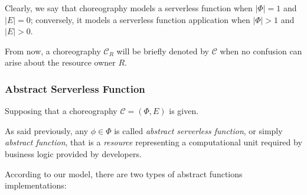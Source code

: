 \documentclass[12pt,a4paper]{report}
\begin{document}
Clearly, we say that choreography models a serverless function when $|\Phi| = 1$ and $|E| = 0$; conversely, it models a serverless function application when $|\Phi| > 1$ and $|E| > 0$.

From now, a choreography $\mathcal{C}_R$ will be briefly denoted by $\mathcal{C}$ when no confusion can arise about the resource owner $R$.

\subsubsection{Abstract Serverless Function}

Supposing that a choreography $\mathcal{C} = (\Phi,E)$ is given.

As said previously, any $\phi \in \Phi$ is called \textit{abstract serverless function}, or simply \textit{abstract function}, that is a \textit{resource} representing a computational unit required by business logic provided by developers.

According to our model, there are two types of abstract functions implementations:
\end{document}
